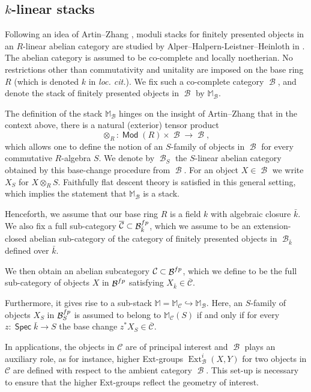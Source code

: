 \documentclass{article}
\newcommand{\Cc}{\mathcal{C}}
\DeclareMathOperator{\Mod}{\mathsf{Mod}}
\DeclareMathOperator{\Bc}{\mathcal{B}}
\DeclareMathOperator{\Spec}{\mathsf{Spec}}
\newcommand{\BM}{{\mathbb{M}}}
\DeclareMathOperator{\Ext}{Ext}
\theoremstyle{definition}
\theoremstyle{plain}
\begin{document}
\subsection{$k$-linear stacks}\label{axms}



Following an idea of Artin--Zhang \cite{AZ01}, moduli stacks for finitely presented objects in an $R$-linear abelian category are studied by Alper--Halpern-Leistner--Heinloth in \cite[Section 7]{AHH23}. The abelian category is assumed to be co-complete and locally noetherian. No restrictions other than commutativity and unitality are imposed on the base ring $R$ (which is denoted $k$ in \emph{loc. cit.}). We fix such a co-complete category $\Bc$, and denote the stack of finitely presented objects in $\Bc$ by $\BM_{\Bc}$.

The definition of the stack $\BM_{\Bc}$ hinges on the insight of Artin--Zhang that in the context above, there is a natural (exterior) tensor product 
$$\otimes_R\colon \Mod(R) \times \Bc \to \Bc,$$
which allows one to define the notion of an $S$-family of objects in $\Bc$ for every commutative $R$-algebra $S$. We denote by $\Bc_S$ the $S$-linear abelian category obtained by this base-change procedure from $\Bc$. For an object $X\in \Bc$ we write $X_S$ for $X \otimes_R S$. Faithfully flat descent theory is satisfied in this general setting, which implies the statement that $\BM_{\Bc}$ is a stack. 

Henceforth, we assume that our base ring $R$ is a field $k$ with algebraic closure $\bar{k}$.
We also fix a full sub-category $\overline{\Cc} \subset \Bc^{\rm fp}_{\bar{k}}$, which we assume to be an extension-closed abelian sub-category of the category of finitely presented objects in $\Bc_{\bar{k}}$ defined over $\bar{k}$. 

We then obtain an abelian subcategory $\Cc \subset \Bc^{\rm fp}$, which we define to be the full sub-category of objects $X$ in $\Bc^{\rm fp}$ satisfying $X_{\bar{k}} \in \overline{\Cc}$.

Furthermore, it gives rise to a sub-stack $\BM = \BM_{\Cc} \hookrightarrow \BM_{\Bc}$. Here, an $S$-family of objects $X_S$ in $\Bc^{\rm fp}_S$ is assumed to belong to $\BM_{\Cc}(S)$ if and only if for every $z\colon \Spec \bar{k} \to S$ the base change $z^*X_S \in \overline{\Cc}$.

In applications, the objects in $\Cc$ are of principal interest and $\Bc$ plays an auxiliary role, as for instance, higher Ext-groups $\Ext^i_{\Bc}(X,Y)$ for two objects in $\Cc$ are defined with respect to the ambient category $\Bc$. This set-up is necessary to ensure that the higher Ext-groups reflect the geometry of interest.
\end{document}
